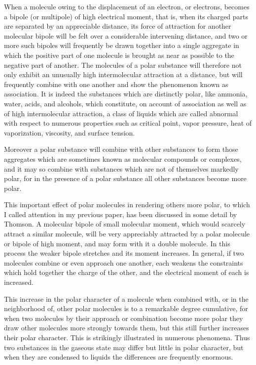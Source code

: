 \documentclass[11pt]{memoir}
\begin{document}
When a molecule owing to the displacement of an electron, or electrons, becomes a bipole (or multipole) of high electrical moment, that is, when its charged parts are separated by an appreciable distance, its force of attraction for another molecular bipole will be felt over a considerable intervening distance, and two or more such bipoles will frequently be drawn together into a single aggregate in which the positive part of one molecule is brought as near as possible to the negative part of another.  The molecules of a polar substance will therefore not only exhibit an unusually high intermolecular attraction at a distance, but will frequently combine with one another and show the phenomenon known as association.  It is indeed the substances which are distinctly polar, like ammonia, water, acids, and alcohols, which constitute, on account of association as well as of high intermolecular attraction, a class of liquids which are called abnormal with respect to numerous properties such as critical point, vapor pressure, heat of vaporization, viscosity, and surface tension.

Moreover a polar substance will combine with other substances to form those aggregates which are sometimes known as molecular compounds or complexes, and it may so combine with substances which are not of themselves markedly polar, for in the presence of a polar substance all other substances become more polar.

This important effect of polar molecules in rendering others more polar, to which I called attention in my previous paper, has been discussed in some detail by Thomson.  A molecular bipole of small molecular moment, which would scarcely attract a similar molecule, will be very appreciably attracted by a polar molecule or bipole of high moment, and may form with it a double molecule.  In this process the weaker bipole stretches and its moment increases.  In general, if two molecules combine or even approach one another, each weakens the constraints which hold together the charge of the other, and the electrical moment of each is increased.

This increase in the polar character of a molecule when combined with, or in the neighborhood of, other polar molecules is to a remarkable degree cumulative, for when two molecules by their approach or combination become more polar they draw other molecules more strongly towards them, but this still further increases their polar character.  This is strikingly illustrated in numerous phenomena.  Thus two substances in the gaseous state may differ but little in polar character, but when they are condensed to liquids the differences are frequently enormous.
\end{document}
